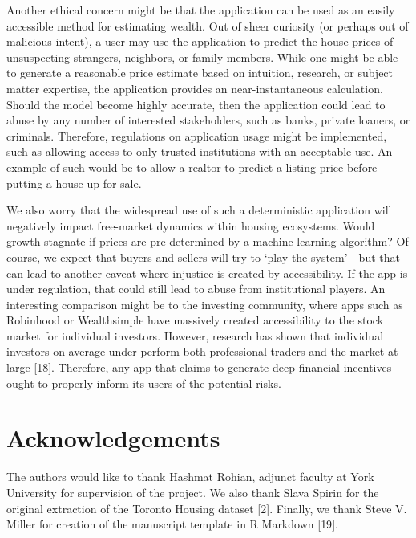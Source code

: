 \documentclass[11pt,]{article}
\begin{document}
Another ethical concern might be that the application can be used as an
easily accessible method for estimating wealth. Out of sheer curiosity
(or perhaps out of malicious intent), a user may use the application to
predict the house prices of unsuspecting strangers, neighbors, or family
members. While one might be able to generate a reasonable price estimate
based on intuition, research, or subject matter expertise, the
application provides an near-instantaneous calculation. Should the model
become highly accurate, then the application could lead to abuse by any
number of interested stakeholders, such as banks, private loaners, or
criminals. Therefore, regulations on application usage might be
implemented, such as allowing access to only trusted institutions with
an acceptable use. An example of such would be to allow a realtor to
predict a listing price before putting a house up for sale.

We also worry that the widespread use of such a deterministic
application will negatively impact free-market dynamics within housing
ecosystems. Would growth stagnate if prices are pre-determined by a
machine-learning algorithm? Of course, we expect that buyers and sellers
will try to `play the system' - but that can lead to another caveat
where injustice is created by accessibility. If the app is under
regulation, that could still lead to abuse from institutional players.
An interesting comparison might be to the investing community, where
apps such as Robinhood or Wealthsimple have massively created
accessibility to the stock market for individual investors. However,
research has shown that individual investors on average under-perform
both professional traders and the market at large {[}18{]}. Therefore,
any app that claims to generate deep financial incentives ought to
properly inform its users of the potential risks.

\hypertarget{acknowledgements}{%
\section{Acknowledgements}\label{acknowledgements}}

The authors would like to thank Hashmat Rohian, adjunct faculty at York
University for supervision of the project. We also thank Slava Spirin
for the original extraction of the Toronto Housing dataset {[}2{]}.
Finally, we thank Steve V. Miller for creation of the manuscript
template in R Markdown {[}19{]}.

\newpage
\end{document}

